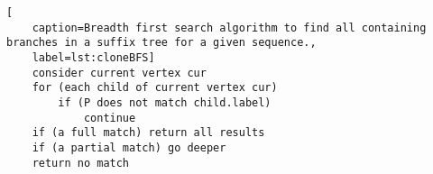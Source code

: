 \copied
\begin{lstlisting}[
	caption=Breadth first search algorithm to find all containing branches in a suffix tree for a given sequence.,
	label=lst:cloneBFS] 
	consider current vertex cur
	for (each child of current vertex cur)
		if (P does not match child.label)
			continue
	if (a full match) return all results
	if (a partial match) go deeper
	return no match	
\end{lstlisting}